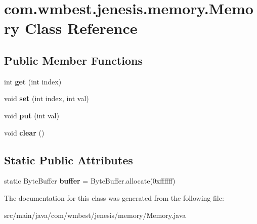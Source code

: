 \hypertarget{classcom_1_1wmbest_1_1jenesis_1_1memory_1_1Memory}{\section{com.\-wmbest.\-jenesis.\-memory.\-Memory Class Reference}
\label{classcom_1_1wmbest_1_1jenesis_1_1memory_1_1Memory}
}
\subsection*{Public Member Functions}
\begin{DoxyCompactItemize}
\item 
\hypertarget{classcom_1_1wmbest_1_1jenesis_1_1memory_1_1Memory_a03517687ad6ede32242b0ae486285abb}{int {\bfseries get} (int index)}\label{classcom_1_1wmbest_1_1jenesis_1_1memory_1_1Memory_a03517687ad6ede32242b0ae486285abb}

\item 
\hypertarget{classcom_1_1wmbest_1_1jenesis_1_1memory_1_1Memory_a04f913a9a838c3c92a9e7859b8232c27}{void {\bfseries set} (int index, int val)}\label{classcom_1_1wmbest_1_1jenesis_1_1memory_1_1Memory_a04f913a9a838c3c92a9e7859b8232c27}

\item 
\hypertarget{classcom_1_1wmbest_1_1jenesis_1_1memory_1_1Memory_a56c68b03edfb58f89d29fcf56fa0577c}{void {\bfseries put} (int val)}\label{classcom_1_1wmbest_1_1jenesis_1_1memory_1_1Memory_a56c68b03edfb58f89d29fcf56fa0577c}

\item 
\hypertarget{classcom_1_1wmbest_1_1jenesis_1_1memory_1_1Memory_a06351f245ecde5e30dc0afbef6293634}{void {\bfseries clear} ()}\label{classcom_1_1wmbest_1_1jenesis_1_1memory_1_1Memory_a06351f245ecde5e30dc0afbef6293634}

\end{DoxyCompactItemize}
\subsection*{Static Public Attributes}
\begin{DoxyCompactItemize}
\item 
\hypertarget{classcom_1_1wmbest_1_1jenesis_1_1memory_1_1Memory_ac89ea0e719c15a7186197d3b61ee2f56}{static Byte\-Buffer {\bfseries buffer} = Byte\-Buffer.\-allocate(0xffffff)}\label{classcom_1_1wmbest_1_1jenesis_1_1memory_1_1Memory_ac89ea0e719c15a7186197d3b61ee2f56}

\end{DoxyCompactItemize}


The documentation for this class was generated from the following file\-:\begin{DoxyCompactItemize}
\item 
src/main/java/com/wmbest/jenesis/memory/Memory.\-java\end{DoxyCompactItemize}
